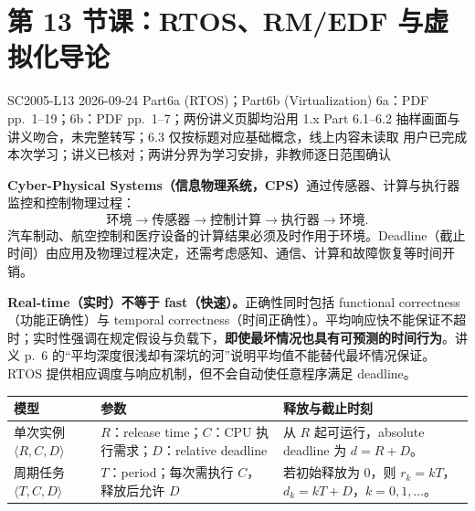 
\section{第 13 节课：RTOS、RM/EDF 与虚拟化导论}
\label{lecture:SC2005-L13}

\lecturemeta
  {SC2005-L13}
  {2026-09-24}
  {Part6a (RTOS)；Part6b (Virtualization)}
  {6a：PDF pp.~1--19；6b：PDF pp.~1--7；两份讲义页脚均沿用 1.x}
  {Part 6.1--6.2 抽样画面与讲义吻合，未完整转写；6.3 仅按标题对应基础概念，线上内容未读取}
  {用户已完成本次学习；讲义已核对；两讲分界为学习安排，非教师逐日范围确认}



\textbf{Cyber-Physical Systems（信息物理系统，CPS）}通过传感器、计算与执行器监控和控制物理过程：
\[
  \text{环境}\longrightarrow\text{传感器}\longrightarrow
  \text{控制计算}\longrightarrow\text{执行器}\longrightarrow\text{环境}.
\]
汽车制动、航空控制和医疗设备的计算结果必须及时作用于环境。Deadline（截止时间）由应用及物理过程决定，还需考虑感知、通信、计算和故障恢复等时间开销。

\textbf{Real-time（实时）不等于 fast（快速）。}正确性同时包括 functional correctness（功能正确性）与 temporal correctness（时间正确性）。平均响应快不能保证不超时；实时性强调在规定假设与负载下，\textbf{即使最坏情况也具有可预测的时间行为}。讲义 p.~6 的“平均深度很浅却有深坑的河”说明平均值不能替代最坏情况保证。RTOS 提供相应调度与响应机制，但不会自动使任意程序满足 deadline。

\begin{center}
\begin{tabularx}{\textwidth}{@{}lXX@{}}
  \toprule
  模型 & 参数 & 释放与截止时刻 \\
  \midrule
  单次实例 $\langle R,C,D\rangle$ & $R$：release time；$C$：CPU 执行需求；$D$：relative deadline & 从 $R$ 起可运行，absolute deadline 为 $d=R+D$。 \\
  周期任务 $\langle T,C,D\rangle$ & $T$：period；每次需执行 $C$，释放后允许 $D$ & 若初始释放为 $0$，则 $r_k=kT$，$d_k=kT+D$，$k=0,1,\ldots$。 \\
  \bottomrule
\end{tabularx}
\end{center}

